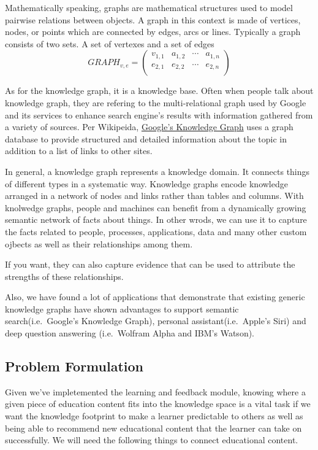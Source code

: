 \documentclass[]{book}
\theoremstyle{definition}
\theoremstyle{definition}
\theoremstyle{definition}
\theoremstyle{remark}
\begin{document}
Mathematically speaking, graphs are mathematical structures used to
model pairwise relations between objects. A graph in this context is
made of vertices, nodes, or points which are connected by edges, arcs or
lines. Typically a graph consists of two sets. A set of vertexes and a
set of edges \[GRAPH_{v,e} =
 \begin{pmatrix}
  v_{1,1} & a_{1,2} & \cdots & a_{1,n} \\
  e_{2,1} & e_{2,2} & \cdots & e_{2,n} \\
 \end{pmatrix}\]

As for the knowledge graph, it is a knowledge base. Often when people
talk about knowledge graph, they are refering to the multi-relational
graph used by Google and its services to enhance search engine's results
with information gathered from a variety of sources. Per Wikipeida,
\href{https://developers.google.com/knowledge-graph/\#knowledge_graph_entities}{Google's
Knowledge Graph} uses a graph database to provide structured and
detailed information about the topic in addition to a list of links to
other sites.

In general, a knowledge graph represents a knowledge domain. It connects
things of different types in a systematic way. Knowledge graphs encode
knowledge arranged in a network of nodes and links rather than tables
and columns. With knolwedge graphs, people and machines can benefit from
a dynamically growing semantic network of facts about things. In other
wrods, we can use it to capture the facts related to people, processes,
applications, data and many other custom ojbects as well as their
relationships among them.

If you want, they can also capture evidence that can be used to
attribute the strengths of these relationships.

Also, we have found a lot of applications that demonstrate that existing
generic knowledge graphs have shown advantages to support semantic
search(i.e.~Google's Knowledge Graph), personal assistant(i.e.~Apple's
Siri) and deep question answering (i.e.~Wolfram Alpha and IBM's Watson).

\subsection{Problem Formulation}\label{problem-formulation-2}

Given we've impletemented the learning and feedback module, knowing
where a given piece of education content fits into the knowledge space
is a vital task if we want the knowledge footprint to make a learner
predictable to others as well as being able to recommend new educational
content that the learner can take on successfully. We will need the
following things to connect educational content.
\end{document}
